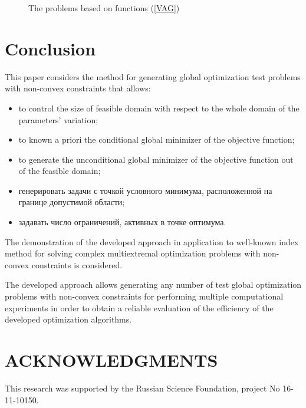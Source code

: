 \documentclass{aip-cp}
\begin{document}
\begin{figure}
\begin{minipage}{0.5\linewidth}
\end{minipage}
\hfill
\begin{minipage}{0.5\linewidth}
\end{minipage}
\caption{The problems based on functions (\ref{VAG}) }
\label{fig:VAG}
\end{figure}


\section {Conclusion}
\Russian
This paper considers the method for generating global optimization test problems with non-convex constraints that allows:
\begin{itemize}
	\item to control the size of feasible domain with respect to the whole domain of the parameters' variation;
	\item to known a priori the conditional global minimizer of the objective function;

	\item to generate the unconditional global minimizer of the objective function out of the feasible domain;
	\item генерировать задачи с точкой условного минимума, расположенной на границе допустимой области;
	\item задавать число ограничений, активных в точке оптимума.
\end{itemize}

The demonstration of the developed approach in application to well-known index method for solving complex multiextremal optimization problems with non-convex constraints is considered.

The developed approach allows generating any number of test global optimization problems with non-convex constraints for performing multiple computational experiments in order to obtain a reliable evaluation of the efficiency of the developed optimization algorithms.

\section{ACKNOWLEDGMENTS}
This research was supported by the Russian Science Foundation, project No 16-11-10150.


%
%
\end{document}

